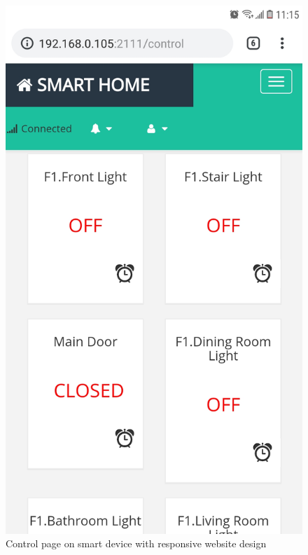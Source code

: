 \begin{figure}[!htbp]
    \begin{center}
    \includegraphics[scale=0.3]{images/controlOnCell.jpg}
    \caption{Control page on smart device with responsive website design}
    \label{fig:controlOnCell}
    \end{center}
\end{figure}

